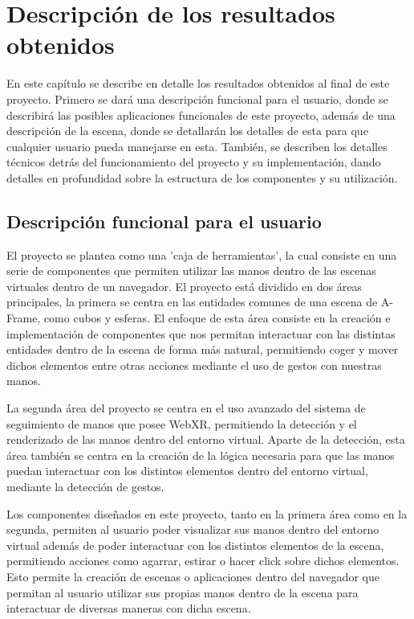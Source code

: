 \documentclass[a4paper, 12pt]{book}
\begin{document}
\cleardoublepage
\chapter{Descripción de los resultados obtenidos}
\label{chap:resultados}
En este capítulo se describe en detalle los resultados obtenidos al final de este proyecto. Primero se dará una descripción funcional para el usuario, donde se describirá las posibles aplicaciones funcionales de este proyecto, además de una descripción de la escena, donde se detallarán los detalles de esta para que cualquier usuario pueda manejarse en esta. También, se describen los detalles técnicos detrás del funcionamiento del proyecto y su implementación,
dando detalles en profundidad sobre la estructura de los componentes y su utilización.

\section{Descripción funcional para el usuario}
\label{sec:manual-usuario}
El proyecto se plantea como una 'caja de herramientas', la cual consiste en una serie de componentes que permiten utilizar las manos dentro de las escenas virtuales dentro de un navegador. El proyecto está dividido en dos áreas principales, la primera se centra en las entidades comunes de una escena de A-Frame, como cubos y esferas. El enfoque de esta área consiste en la creación e implementación de componentes que nos permitan interactuar con las distintas entidades dentro de la escena de forma más natural, permitiendo coger y mover dichos elementos entre otras acciones mediante el uso de gestos con nuestras manos.

La segunda área del proyecto se centra en el uso avanzado del sistema de seguimiento de manos que posee WebXR, permitiendo la detección y el renderizado de las manos dentro del entorno virtual. Aparte de la detección, esta área también se centra en la creación de la lógica necesaria para que las manos puedan interactuar con los distintos elementos dentro del entorno virtual, mediante la detección de gestos.

Los componentes diseñados en este proyecto, tanto en la primera área como en la segunda, permiten al usuario poder visualizar sus manos dentro del entorno virtual además de poder interactuar con los distintos elementos de la escena, permitiendo acciones como agarrar, estirar o hacer click sobre dichos elementos. Esto permite la creación de escenas o aplicaciones dentro del navegador que permitan al usuario utilizar sus propias manos dentro de la escena para interactuar de diversas maneras con dicha escena. 
\end{document}

